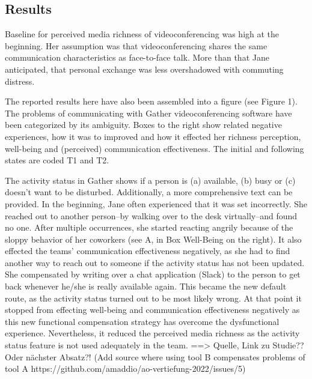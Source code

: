 \documentclass[man]{apa7}
\begin{document}
\subsection{Results}

Baseline for perceived media richness of videoconferencing was high at the beginning. Her assumption was that videoconferencing shares the same communication characteristics as face-to-face talk. More than that Jane anticipated, that personal exchange was less overshadowed with commuting distress.

The reported results here have also been assembled into a figure (see Figure 1). The problems of communicating with Gather videoconferencing software have been categorized by its ambiguity. Boxes to the right show related negative experiences, how it was to improved and how it effected her richness perception, well-being and (perceived) communication effectiveness. The initial and following states are coded T1 and T2.

The activity status in Gather shows if a person is (a) available, (b) busy or (c) doesn't want to be disturbed. Additionally, a more comprehensive text can be provided. In the beginning, Jane often experienced that it was set incorrectly. She reached out to another person–by walking over to the desk virtually–and found no one. After multiple occurrences, she started reacting angrily because of the sloppy behavior of her coworkers (see A, in Box Well-Being on the right). It also effected the teams' communication effectiveness negatively, as she had to find another way to reach out to someone if the activity status has not been updated. She compensated by writing over a chat application (Slack) to the person to get back whenever he/she is really available again. This became the new default route, as the activity status turned out to be most likely wrong. At that point it stopped from effecting well-being and communication effectiveness negatively as this new functional compensation strategy has overcome the dysfunctional experience. Nevertheless, it reduced the perceived media richness as the activity status feature is not used adequately in the team. ==> Quelle, Link zu Studie?? Oder nächster Absatz?! (Add source where using tool B compensates problems of tool A https://github.com/amaddio/ao-vertiefung-2022/issues/5)
\end{document}

